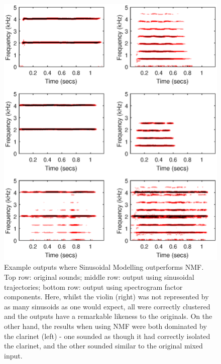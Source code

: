 \documentclass[12pt,a4paper,twoside,openright]{report}
\begin{document}


\begin{figure}
\centering
\includegraphics[width=0.7\linewidth]{../OutputSpectrograms/sinNMFcompSpec1}
\caption[Example outputs where Sinusoidal Modelling outperforms NMF.]{Example outputs where Sinusoidal Modelling outperforms NMF. Top row: original sounds; middle row: output using sinusoidal trajectories; bottom row: output using spectrogram factor components. Here, whilst the violin (right) was not represented by as many sinusoids as one would expect, all were correctly clustered and the outputs have a remarkable likeness to the originals. On the other hand, the results when using NMF were both dominated by the clarinet (left) - one sounded as though it had correctly isolated the clarinet, and the other sounded similar to the original mixed input.}
\label{fig:sinNMFcompSpec1}
\end{figure}
\end{document}
